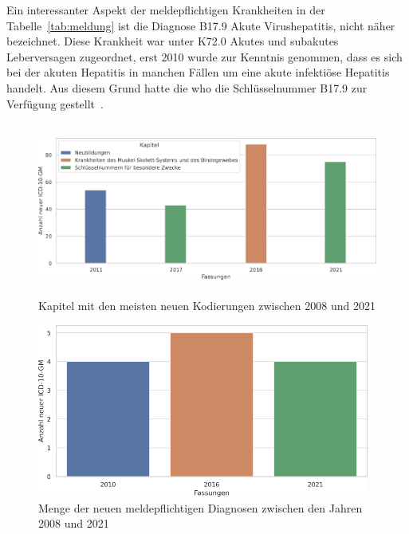 
Ein interessanter Aspekt der meldepflichtigen Krankheiten in der Tabelle~\ref{tab:meldung} ist die Diagnose \textsf{B17.9} \textsf{Akute Virushepatitis, nicht näher bezeichnet}. Diese Krankheit war unter \textsf{K72.0} \textsf{Akutes und subakutes Leberversagen} zugeordnet, erst 2010 wurde zur Kenntnis genommen, dass es sich bei der akuten Hepatitis in manchen Fällen um eine akute infektiöse Hepatitis handelt. Aus diesem Grund hatte die \ac{who} die Schlüsselnummer \textsf{B17.9} zur Verfügung gestellt~\cite{komm10}.

\clearpage

\begin{figure}[ht]
	\centering
	\includegraphics[height=5.7cm]{figures/kaptnrYear}
	\caption[Kapitel mit den meisten eingeführten \acs{icd10gm} (2008 - 2021)]{Kapitel mit den meisten neuen Kodierungen zwischen 2008 und 2021}
	\label{fig:newicdcap}
\end{figure}

\begin{figure}[ht]
	\centering
	\includegraphics[height=5.7cm]{figures/arztJaYear}
	\caption[Neue meldepflichtige \acs{icd10gm} pro Jahr]{Menge der neuen meldepflichtigen Diagnosen zwischen den Jahren 2008 und 2021}
	\label{fig:newicdmeld}
\end{figure} 

